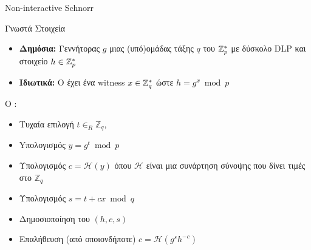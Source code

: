 \documentclass[handout]{beamer}
\begin{document}
\begin{frame}{Non-interactive Schnorr}
\begin{block}{Γνωστά Στοιχεία}
\begin{itemize}
\item \textbf{Δημόσια:} Γεννήτορας $g$ μιας (υπό)ομάδας τάξης $q$ του $\mathbb{Z}^*_{p}$ με δύσκολο DLP και στοιχείο $h \in \mathbb{Z}^*_{p}$ 
\item \textbf{Ιδιωτικά:} O \prv έχει ένα witness $x \in \mathbb{Z}^*_{q}$ ώστε $h = g^x \bmod{p}$
\end{itemize}
\end{block}
\pause
O  \prv:
\begin{itemize}
\item Τυχαία επιλογή $t \in_R \mathbb{Z}_{q}$,
\pause
\item Yπολογισμός $y = g^t \bmod{p}$
\pause
\item Υπολογισμός $c = \mathcal{H}(y)$ όπου $\mathcal{H}$ είναι μια συνάρτηση σύνοψης που δίνει τιμές στο $\mathbb{Z}_{q}$
\pause

\item Υπολογισμός $s=t+cx \bmod{q}$
\pause
\item Δημοσιοποίηση του $(h,c,s)$
\pause
\item Επαλήθευση (από οποιονδήποτε) $c = \mathcal{H} (g^s h^{-c})$
\end{itemize}
\end{frame} 
\end{document}
